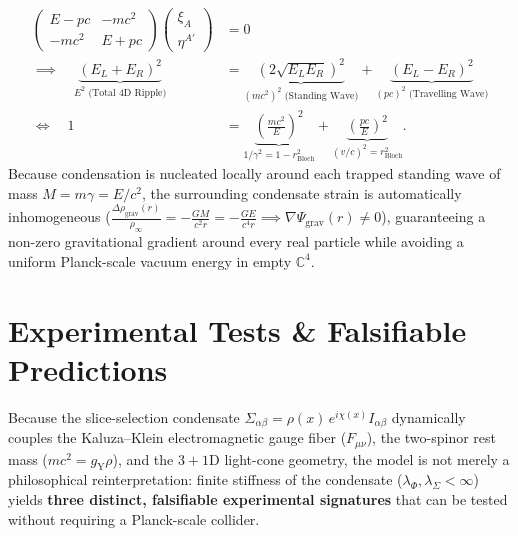 \documentclass[11pt,a4paper]{article}
\begin{document}
\begin{enumerate}
    \begin{equation}
    \begin{aligned}
    \begin{pmatrix} E - pc & -mc^2 \\ -mc^2 & E + pc \end{pmatrix} \begin{pmatrix} \xi_A \\ \eta^{A'} \end{pmatrix} &= 0 \\
    \implies \quad \underbrace{\left(E_L + E_R\right)^2}_{E^2\text{ (Total 4D Ripple)}} &= \underbrace{\left(2\sqrt{E_L E_R}\right)^2}_{(mc^2)^2\text{ (Standing Wave)}} + \underbrace{\left(E_L - E_R\right)^2}_{(pc)^2\text{ (Travelling Wave)}} \\
    \iff \quad 1 &= \underbrace{\left(\frac{mc^2}{E}\right)^2}_{1/\gamma^2 = 1 - r_{\text{Bloch}}^2} + \underbrace{\left(\frac{pc}{E}\right)^2}_{(v/c)^2 = r_{\text{Bloch}}^2}.
    \end{aligned}
    \end{equation}
    Because condensation is nucleated locally around each trapped standing wave of mass $M = m\gamma = E/c^2$, the surrounding condensate strain is automatically inhomogeneous ($\frac{\Delta \rho_{\text{grav}}(r)}{\rho_\infty} = -\frac{GM}{c^2 r} = -\frac{GE}{c^4 r} \implies \nabla\Psi_{\text{grav}}(r) \neq 0$), guaranteeing a non-zero gravitational gradient around every real particle while avoiding a uniform Planck-scale vacuum energy in empty $\mathbb{C}^4$.
\end{enumerate}

\section{Experimental Tests \& Falsifiable Predictions}

Because the slice-selection condensate $\Sigma_{\alpha\beta} = \rho(x)\,e^{i\chi(x)} I_{\alpha\beta}$ dynamically couples the Kaluza--Klein electromagnetic gauge fiber ($F_{\mu\nu}$), the two-spinor rest mass ($mc^2 = g_{\text{Y}}\rho$), and the $3+1\text{D}$ light-cone geometry, the model is not merely a philosophical reinterpretation: finite stiffness of the condensate ($\lambda_\Phi, \lambda_\Sigma < \infty$) yields \textbf{three distinct, falsifiable experimental signatures} that can be tested without requiring a Planck-scale collider.
\end{document}
